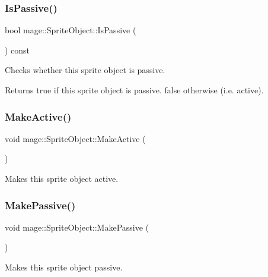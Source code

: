 \subsubsection{\texorpdfstring{Is\+Passive()}{IsPassive()}}
{\footnotesize\ttfamily bool mage\+::\+Sprite\+Object\+::\+Is\+Passive (\begin{DoxyParamCaption}{ }\end{DoxyParamCaption}) const}

Checks whether this sprite object is passive.

\begin{DoxyReturn}{Returns}
{\ttfamily true} if this sprite object is passive. {\ttfamily false} otherwise (i.\+e. active). 
\end{DoxyReturn}
\hypertarget{classmage_1_1_sprite_object_a11056bf3002461e38f8780e2bfc31db3}{}\label{classmage_1_1_sprite_object_a11056bf3002461e38f8780e2bfc31db3} 
\subsubsection{\texorpdfstring{Make\+Active()}{MakeActive()}}
{\footnotesize\ttfamily void mage\+::\+Sprite\+Object\+::\+Make\+Active (\begin{DoxyParamCaption}{ }\end{DoxyParamCaption})}

Makes this sprite object active. \hypertarget{classmage_1_1_sprite_object_a536fead50b0e4049e1c74b359a491529}{}\label{classmage_1_1_sprite_object_a536fead50b0e4049e1c74b359a491529} 
\subsubsection{\texorpdfstring{Make\+Passive()}{MakePassive()}}
{\footnotesize\ttfamily void mage\+::\+Sprite\+Object\+::\+Make\+Passive (\begin{DoxyParamCaption}{ }\end{DoxyParamCaption})}

Makes this sprite object passive. \hypertarget{classmage_1_1_sprite_object_ab24af642e7c49a13ca5526248f106b4e}{}\label{classmage_1_1_sprite_object_ab24af642e7c49a13ca5526248f106b4e} 
